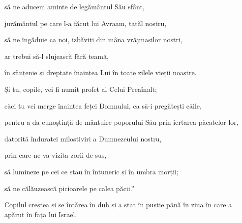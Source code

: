 {\par }{\QB să ne aducem aminte de legământul Său sfânt,


\par }{\Q {}jurământul pe care l-a făcut lui Avraam, tatăl nostru,


\par }{\QB {}să ne îngăduie ca noi, izbăviți din mâna vrăjmașilor noștri,

\par }{\QB ar trebui să-l slujească fără teamă,


\par }{\QB {}în sfințenie și dreptate înaintea Lui în toate zilele vieții noastre.


\par }{\Q {}Și tu, copile, vei fi numit profet al Celui Preaînalt;

\par }{\QB căci tu vei merge înaintea feței Domnului, ca să-i pregătești căile,


\par }{\QB {}pentru a da cunoștință de mântuire poporului Său prin iertarea păcatelor lor,


\par }{\Q {}datorită înduratei milostiviri a Dumnezeului nostru,

\par }{\QB prin care ne va vizita zorii de sus,


\par }{\QB {}să lumineze pe cei ce stau în întuneric și în umbra morții;

\par }{\QB să ne călăuzească picioarele pe calea păcii.”


\par }{\PP {}Copilul creștea și se întărea în duh și a stat în pustie până în ziua în care a apărut în fața lui Israel.



\par }
